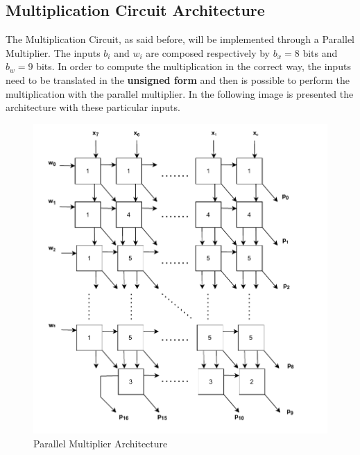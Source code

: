 \subsection{Multiplication Circuit Architecture}
The Multiplication Circuit, as said before, will be implemented through a Parallel Multiplier. The inputs $b_{i}$ and $w_{i}$ are composed respectively by $b_{x} = 8$ bits and $b_{w} = 9$ bits. In order to compute the multiplication in the correct way, the inputs need to be translated in the \textbf{unsigned form} and then is possible to perform the multiplication with the parallel multiplier. In the following image is presented the architecture with these particular inputs.
\begin{figure}[H]
	\centering
	\includegraphics[width=13cm]{img/architecture_parallel_multiplier.pdf}
	\caption{Parallel Multiplier Architecture}
\end{figure}
